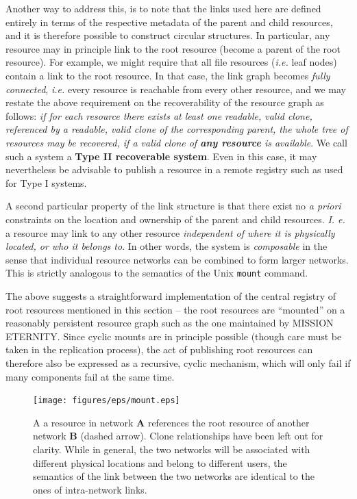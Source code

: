\documentclass[11pt]{article}
\begin{document}
\begin{mainmatter}
Another way to address this, is to note that the links used here are defined entirely in terms of the respective metadata of the parent and child resources, and it is therefore possible to construct circular structures. In particular, any resource may in principle link to the root resource (become a parent of the root resource). For example, we might require that all file resources (\emph{i.e.} leaf nodes) contain a link to the root resource. In that case, the link graph becomes \emph{fully connected}, \emph{i.e.} every resource is reachable from every other resource, and we may restate the above requirement on the recoverability of the resource graph as follows: \emph{if for each resource there exists at least one readable, valid clone, referenced by a readable, valid clone of the corresponding parent, the whole tree of resources may be recovered, if a valid clone of \textbf{any resource} is available}. We call such a system a\label{typeTwo} \textbf{Type II recoverable system}. Even in this case, it may nevertheless be advisable to publish a resource in a remote registry such as used for Type I systems.

A second particular property of the link structure is that there exist no \emph{a priori} constraints on the location and ownership of the parent and child resources. \emph{I. e.} a resource may link to any other resource \emph{independent of where it is physically located, or who it belongs to}. In other words, the system is \emph{composable} in the sense that individual resource networks can be combined to form larger networks. This is strictly analogous to the semantics of the Unix \texttt{mount} command. 

The above suggests a straightforward implementation of the central registry of root resources mentioned in this section -- the root resources are ``mounted'' on a reasonably persistent resource graph such as the one maintained by MISSION ETERNITY. Since cyclic mounts are in principle possible (though care must be taken in the replication process), the act of publishing root resources can therefore also be expressed as a recursive, cyclic mechanism, which will only fail if many components fail at the same time.


\begin{figure}[ht!]
\texttt{[image: figures/eps/mount.eps]}
\caption{
A a resource in network \textbf{A} references the root resource of another network \textbf{B} (dashed arrow). Clone relationships have been left out for clarity. While in general, the two networks will be associated with different physical locations and belong to different users, the semantics of the link between the two networks are identical to the ones of intra-network links. 
}
\end{figure}


\end{mainmatter}
\end{document}
